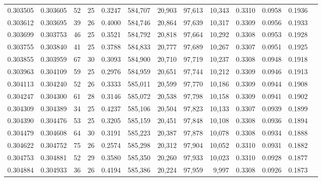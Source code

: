 \begin{tabular}{rrrrrrrrrrrrr}
0.303505 & 0.303605 &  52 &  25 &                                     0.3247 & 584,707 &  20,903 &  97,613 &  10,343 & 0.3310 & 0.0958 & 0.1936 \\
0.303612 & 0.303695 &  39 &  26 &                                     0.4000 & 584,746 &  20,864 &  97,639 &  10,317 & 0.3309 & 0.0956 & 0.1933 \\
0.303699 & 0.303753 &  46 &  25 &                                     0.3521 & 584,792 &  20,818 &  97,664 &  10,292 & 0.3308 & 0.0953 & 0.1928 \\
0.303755 & 0.303840 &  41 &  25 &                                     0.3788 & 584,833 &  20,777 &  97,689 &  10,267 & 0.3307 & 0.0951 & 0.1925 \\
0.303855 & 0.303959 &  67 &  30 &                                     0.3093 & 584,900 &  20,710 &  97,719 &  10,237 & 0.3308 & 0.0948 & 0.1918 \\
0.303963 & 0.304109 &  59 &  25 &                                     0.2976 & 584,959 &  20,651 &  97,744 &  10,212 & 0.3309 & 0.0946 & 0.1913 \\
0.304113 & 0.304240 &  52 &  26 &                                     0.3333 & 585,011 &  20,599 &  97,770 &  10,186 & 0.3309 & 0.0944 & 0.1908 \\
0.304247 & 0.304300 &  61 &  28 &                                     0.3146 & 585,072 &  20,538 &  97,798 &  10,158 & 0.3309 & 0.0941 & 0.1902 \\
0.304309 & 0.304389 &  34 &  25 &                                     0.4237 & 585,106 &  20,504 &  97,823 &  10,133 & 0.3307 & 0.0939 & 0.1899 \\
0.304390 & 0.304476 &  53 &  25 &                                     0.3205 & 585,159 &  20,451 &  97,848 &  10,108 & 0.3308 & 0.0936 & 0.1894 \\
0.304479 & 0.304608 &  64 &  30 &                                     0.3191 & 585,223 &  20,387 &  97,878 &  10,078 & 0.3308 & 0.0934 & 0.1888 \\
0.304622 & 0.304752 &  75 &  26 &                                     0.2574 & 585,298 &  20,312 &  97,904 &  10,052 & 0.3310 & 0.0931 & 0.1882 \\
0.304753 & 0.304881 &  52 &  29 &                                     0.3580 & 585,350 &  20,260 &  97,933 &  10,023 & 0.3310 & 0.0928 & 0.1877 \\
0.304884 & 0.304933 &  36 &  26 &                                     0.4194 & 585,386 &  20,224 &  97,959 &   9,997 & 0.3308 & 0.0926 & 0.1873 \\

\end{tabular}
